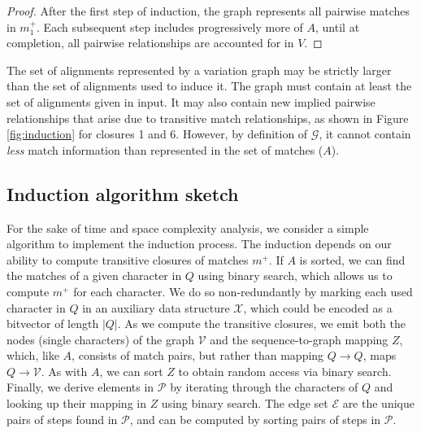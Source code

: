 \documentclass{bioinfo}
\theoremstyle{definition}
\begin{document}
\begin{proof}
After the first step of induction, the graph represents all pairwise matches in $m_1^+$.
Each subsequent step includes progressively more of $A$, until at completion, all pairwise relationships are accounted for in $V$.
\end{proof}

The set of alignments represented by a variation graph may be strictly larger than the set of alignments used to induce it.
The graph must contain at least the set of alignments given in input.
It may also contain new implied pairwise relationships that arise due to transitive match relationships, as shown in Figure \ref{fig:induction} for closures 1 and 6.
However, by definition of $\mathcal{G}$, it cannot contain \textit{less} match information than represented in the set of matches ($A$).



\subsection{Induction algorithm sketch}

For the sake of time and space complexity analysis, we consider a simple algorithm to implement the induction process.
The induction depends on our ability to compute transitive closures of matches $m^+$.
If $A$ is sorted, we can find the matches of a given character in $Q$ using binary search, which allows us to compute $m^+$ for each character.
We do so non-redundantly by marking each used character in $Q$ in an auxiliary data structure $\mathcal{X}$, which could be encoded as a bitvector of length $|Q|$.
As we compute the transitive closures, we emit both the nodes (single characters) of the graph $\mathcal{V}$ and the sequence-to-graph mapping $Z$, which, like $A$, consists of match pairs, but rather than mapping $Q \to Q$, maps $Q \to \mathcal{V}$.
As with $A$, we can sort $Z$ to obtain random access via binary search.
Finally, we derive elements in $\mathcal{P}$ by iterating through the characters of $Q$ and looking up their mapping in $Z$ using binary search.
The edge set $\mathcal{E}$ are the unique pairs of steps found in $\mathcal{P}$, and can be computed by sorting pairs of steps in $\mathcal{P}$.
\end{document}
